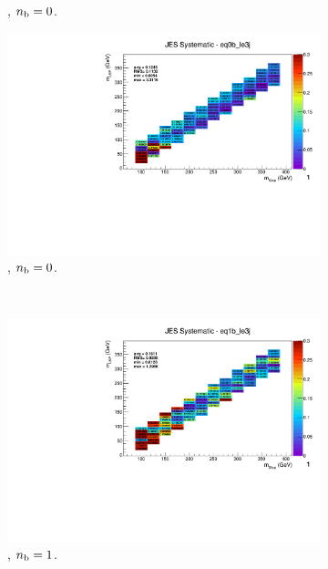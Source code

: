 \begin{figure}[ht!]
\begin{subfigure}[b]{0.32\textwidth}
    \caption{\njlow, $n_{\text{b}} = 0$.}
  \end{subfigure}
  \begin{subfigure}[b]{0.32\textwidth}
    \includegraphics[width=\textwidth, page=1]{Figs/sms/t2degen/v19/systs/T2_4body_JES_eq0b_le3j.pdf}
    \caption{\njlow, $n_{\text{b}} = 0$.}
    \label{fig:sms-jes-tdegen-le3j-0b}
  \end{subfigure}\\
  \begin{subfigure}[b]{0.32\textwidth}
    \includegraphics[width=\textwidth, page=12]{Figs/sms/t2degen/v19/systs/T2_4body_JES_eq1b_le3j.pdf}
    \caption{\njlow, $n_{\text{b}} = 1$.}
  \end{subfigure}
  \begin{subfigure}[b]{0.32\textwidth}

\end{subfigure}
\end{figure}
